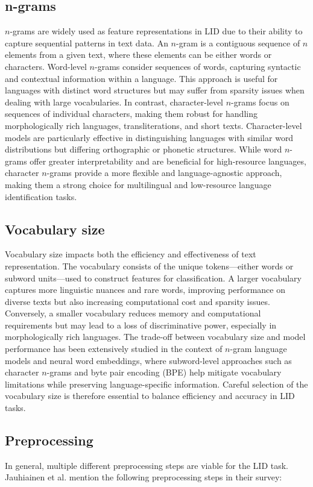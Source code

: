\subsection{n-grams}
$n$-grams are widely used as feature representations in LID due to their ability to capture sequential patterns in text data. An $n$-gram is a contiguous sequence of $n$ elements from a given text, where these elements can be either words or characters. Word-level $n$-grams consider sequences of words, capturing syntactic and contextual information within a language. This approach is useful for languages with distinct word structures but may suffer from sparsity issues when dealing with large vocabularies. In contrast, character-level $n$-grams focus on sequences of individual characters, making them robust for handling morphologically rich languages, transliterations, and short texts. Character-level models are particularly effective in distinguishing languages with similar word distributions but differing orthographic or phonetic structures. While word $n$-grams offer greater interpretability and are beneficial for high-resource languages, character $n$-grams provide a more flexible and language-agnostic approach, making them a strong choice for multilingual and low-resource language identification tasks. \cite{CavnarTrenkle1994}

\subsection{Vocabulary size}
Vocabulary size impacts both the efficiency and effectiveness of text representation. The vocabulary consists of the unique tokens—either words or subword units—used to construct features for classification. A larger vocabulary captures more linguistic nuances and rare words, improving performance on diverse texts but also increasing computational cost and sparsity issues. Conversely, a smaller vocabulary reduces memory and computational requirements but may lead to a loss of discriminative power, especially in morphologically rich languages. The trade-off between vocabulary size and model performance has been extensively studied in the context of $n$-gram language models and neural word embeddings, where subword-level approaches such as character $n$-grams and byte pair encoding (BPE) help mitigate vocabulary limitations while preserving language-specific information. Careful selection of the vocabulary size is therefore essential to balance efficiency and accuracy in LID tasks.

\subsection{Preprocessing}
In general, multiple different preprocessing steps are viable for the LID task. Jauhiainen et al. mention the following preprocessing steps in their survey: \cite{Jauhiainen2019}

